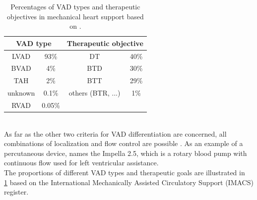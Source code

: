 \begin{table}[h]
  \centering
  \begin{tabular}{cc|cc}
    \toprule
    \multicolumn{2}{c|}{VAD type} &
    \multicolumn{2}{c}{Therapeutic objective} \\
    \midrule
    LVAD & 93\% & DT & 40\%\\
    BVAD & 4\% & BTD & 30\%\\
    TAH & 2\% & BTT & 29\%\\
    unknown & 0.1\% & others (BTR, ...) & 1\%\\
    RVAD & 0.05\% & &\\
    \bottomrule
\end{tabular}
  \caption[Distribution of VAD types and therapeutic objectives]{Percentages of VAD types and therapeutic objectives in mechanical heart support based on \cite{VAD7}.}
  \label{tab:Table2}
\end{table}
\\As far as the other two criteria for VAD differentiation are concerned, all combinations of localization and flow control are possible \cite{VAD10}. As an example of a percutaneous device, \cite{VAD7} names the Impella 2.5, which is a rotary blood pump with continuous flow used for left ventricular assistance.
\\The proportions of different VAD types and therapeutic goals are illustrated in \tablename~ \ref{tab:Table2} based on the International Mechanically Assisted Circulatory Support (IMACS) register.
